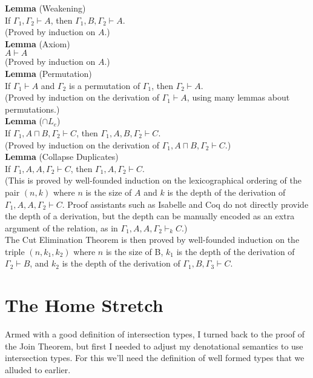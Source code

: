 \documentclass{article}
\begin{document}
\noindent \textbf{Lemma} (Weakening)\\
  If $\Gamma_1,\Gamma_2 \vdash A$,
  then $\Gamma_1,B,\Gamma_2 \vdash A$. \\
  (Proved by induction on $A$.) \\

\noindent \textbf{Lemma} (Axiom)\\
$A \vdash A$ \\
  (Proved by induction on $A$.)\\

\noindent \textbf{Lemma} (Permutation)\\
  If $\Gamma_1 \vdash A$ and $\Gamma_2$ is a permutation of $\Gamma_1$,
  then $\Gamma_2 \vdash A$. \\
  (Proved by induction on the derivation of $\Gamma_1 \vdash A$,
   using many lemmas about permutations.)\\
  
\noindent \textbf{Lemma} ($\cap L_e$) \\
If $\Gamma_1,A\sqcap B,\Gamma_2 \vdash C$, then
$\Gamma_1,A, B,\Gamma_2 \vdash C$. \\
(Proved by induction on the derivation of $\Gamma_1,A\sqcap B,\Gamma_2
\vdash C$.)\\

\noindent \textbf{Lemma} (Collapse Duplicates) \\
%
If $\Gamma_1,A,A,\Gamma_2 \vdash C$, then $\Gamma_1,A,\Gamma_2 \vdash
C$. \\
%
(This is proved by well-founded induction on the lexicographical
ordering of the pair $(n,k)$ where $n$ is the size of $A$ and $k$ is
the depth of the derivation of $\Gamma_1,A,A,\Gamma_2 \vdash C$. Proof
assistants such as Isabelle and Coq do not directly provide the depth
of a derivation, but the depth can be manually encoded as an extra
argument of the relation, as in $\Gamma_1,A,A,\Gamma_2 \vdash_k C$.) \\

The Cut Elimination Theorem is then proved by well-founded induction
on the triple $(n,k_1,k_2)$ where $n$ is the size of B, $k_1$ is the
depth of the derivation of $\Gamma_2 \vdash B$, and $k_2$ is the depth
of the derivation of $\Gamma_1,B,\Gamma_3 \vdash C$.


\section{The Home Stretch}

Armed with a good definition of intersection types, I turned back to
the proof of the Join Theorem, but first I needed to adjust my
denotational semantics to use intersection types. For this we'll need
the definition of well formed types that we alluded to earlier.
\end{document}
